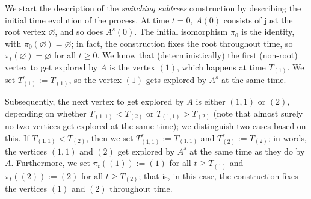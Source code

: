 \documentclass[11pt]{article}
\numberwithin{equation}{section}
\theoremstyle{definition}
\begin{document}
We start the description of the \emph{switching subtrees} construction by describing the initial time evolution of the process. 
At time $t = 0$, $A(0)$ consists of just the root vertex $\varnothing$, and so does $A^{s}(0)$. 
The initial isomorphism $\pi_{0}$ is the identity, with $\pi_{0}(\varnothing) = \varnothing$; 
in fact, the construction fixes the root throughout time, so $\pi_{t}(\varnothing) = \varnothing$ for all $t \geq 0$. 
We know that (deterministically) the first (non-root) vertex to get explored by $A$ is the vertex $(1)$, which happens at time $T_{(1)}$. 
We set $T_{(1)}^{s} := T_{(1)}$, so the vertex $(1)$ gets explored by $A^{s}$ at the same time. 

Subsequently, the next vertex to get explored by $A$ is either $(1,1)$ or $(2)$, depending on whether $T_{(1,1)} < T_{(2)}$ or $T_{(1,1)} > T_{(2)}$ 
(note that almost surely no two vertices get explored at the same time); 
we distinguish two cases based on this. 
If $T_{(1,1)} < T_{(2)}$, 
then we set $T_{(1,1)}^{s} := T_{(1,1)}$ and $T_{(2)}^{s} := T_{(2)}$; 
in words, the vertices $(1,1)$ and $(2)$ get explored by $A^{s}$ at the same time as they do by $A$. 
Furthermore, 
we set 
$\pi_{t}((1)) := (1)$ for all $t \geq T_{(1)}$ 
and 
$\pi_{t}((2)) := (2)$ for all $t \geq T_{(2)}$; 
that is, in this case, the construction fixes the vertices $(1)$ and $(2)$ throughout time.
\end{document}
